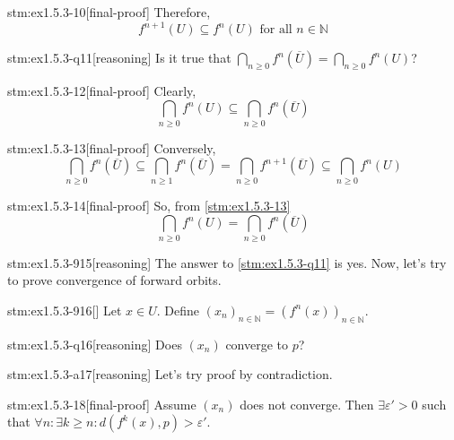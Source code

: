 \begin{stm}{stm:ex1.5.3-10}[final-proof]
Therefore, 
$$f^{n+1}(U) \subseteq f^n(U) \text{ for all } n \in \mathbb{N}$$
\end{stm}
    
\begin{stm}{stm:ex1.5.3-q11}[reasoning]
Is it true that $\bigcap_{n \ge 0} f^n(\overline{U}) = \bigcap_{n \ge 0} f^n(U)$?
\end{stm}

\begin{stm}{stm:ex1.5.3-12}[final-proof]
Clearly,
$$\bigcap_{n \ge 0} f^n(U) \subseteq \bigcap_{n \ge 0} f^n(\overline{U})$$
\end{stm}

\begin{stm}{stm:ex1.5.3-13}[final-proof]
Conversely, 
$$\bigcap_{n \ge 0} f^n(\overline{U}) \subseteq \bigcap_{n \ge 1} f^n(\overline{U}) = \bigcap_{n \ge 0} f^{n+1}(\overline{U}) \subseteq \bigcap_{n \ge 0} f^n(U)$$
\end{stm}

\begin{stm}{stm:ex1.5.3-14}[final-proof]
So, from \ref{stm:ex1.5.3-13}
$$\bigcap_{n \ge 0} f^n(U) = \bigcap_{n \ge 0} f^n(\overline{U})$$
\end{stm}

\begin{stm}{stm:ex1.5.3-915}[reasoning]
The answer to \ref{stm:ex1.5.3-q11} is yes. Now, let's try to prove convergence of forward orbits. 
\end{stm}

\begin{stm}{stm:ex1.5.3-916}[]
Let $x \in U$. Define $(x_n)_{n \in \mathbb{N}} = (f^n(x))_{n \in \mathbb{N}}$.
\end{stm}

\begin{stm}{stm:ex1.5.3-q16}[reasoning]
Does $(x_n)$ converge to $p$?
\end{stm}

\begin{stm}{stm:ex1.5.3-a17}[reasoning]
Let's try proof by contradiction. 
\end{stm}

\begin{stm}{stm:ex1.5.3-18}[final-proof]
Assume $(x_n)$ does not converge. Then $\exists \varepsilon' > 0$ such that $\forall n : \exists k \ge n : d(f^k(x), p) > \varepsilon'$.
\end{stm}

